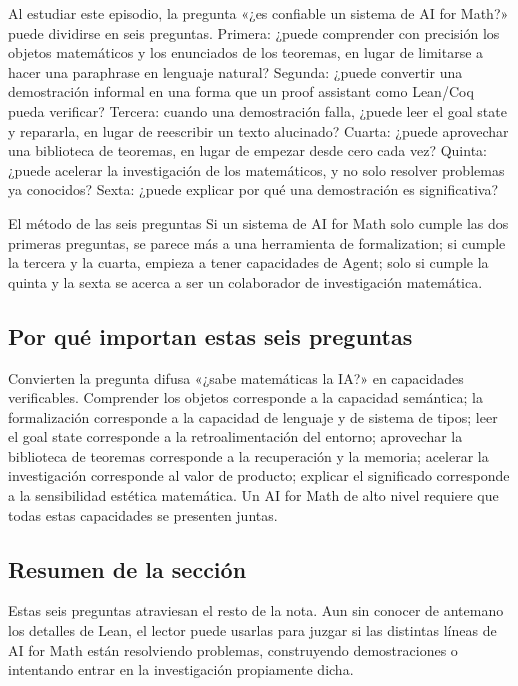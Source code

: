 \documentclass[a4paper]{article}
\begin{document}
Al estudiar este episodio, la pregunta «¿es confiable un sistema de AI for Math?» puede dividirse en seis preguntas. Primera: ¿puede comprender con precisión los objetos matemáticos y los enunciados de los teoremas, en lugar de limitarse a hacer una paraphrase en lenguaje natural? Segunda: ¿puede convertir una demostración informal en una forma que un proof assistant como Lean/Coq pueda verificar? Tercera: cuando una demostración falla, ¿puede leer el goal state y repararla, en lugar de reescribir un texto alucinado? Cuarta: ¿puede aprovechar una biblioteca de teoremas, en lugar de empezar desde cero cada vez? Quinta: ¿puede acelerar la investigación de los matemáticos, y no solo resolver problemas ya conocidos? Sexta: ¿puede explicar por qué una demostración es significativa?

\begin{importantbox}{El método de las seis preguntas}
Si un sistema de AI for Math solo cumple las dos primeras preguntas, se parece más a una herramienta de formalization; si cumple la tercera y la cuarta, empieza a tener capacidades de Agent; solo si cumple la quinta y la sexta se acerca a ser un colaborador de investigación matemática.
\end{importantbox}

\subsection{Por qué importan estas seis preguntas}

Convierten la pregunta difusa «¿sabe matemáticas la IA?» en capacidades verificables. Comprender los objetos corresponde a la capacidad semántica; la formalización corresponde a la capacidad de lenguaje y de sistema de tipos; leer el goal state corresponde a la retroalimentación del entorno; aprovechar la biblioteca de teoremas corresponde a la recuperación y la memoria; acelerar la investigación corresponde al valor de producto; explicar el significado corresponde a la sensibilidad estética matemática. Un AI for Math de alto nivel requiere que todas estas capacidades se presenten juntas.

\subsection{Resumen de la sección}

Estas seis preguntas atraviesan el resto de la nota. Aun sin conocer de antemano los detalles de Lean, el lector puede usarlas para juzgar si las distintas líneas de AI for Math están resolviendo problemas, construyendo demostraciones o intentando entrar en la investigación propiamente dicha.
\end{document}
